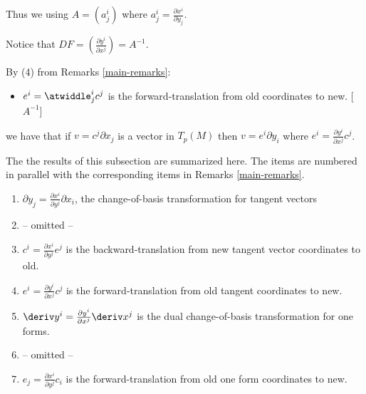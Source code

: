 \documentclass[oneside,12pt]{amsart}
\begin{document}
Thus we using $A = (a^i_j)$ where $a^i_j = \frac{\partial x^i}{\partial y_j}$.

Notice that $DF = (\frac{\partial y^i}{\partial x^j}) = A^{-1}$.

By (4) from Remarks \ref{main-remarks}:
\begin{itemize}
\item $e^i = \atwiddle^i_j c^j$ is the forward-translation from old coordinates to new. [$A^{-1}$]
\end{itemize}

we have that if $v = c^j \partial x_j$ is a vector in $T_p(M)$ then
$v = e^i \partial y_i$ where $e^i = \frac{\partial y^i}{\partial x^j} c^j$.

\begin{remarks}
The the results of this subsection are summarized here. The items are numbered in parallel with
the corresponding items in Remarks \ref{main-remarks}.
\begin{enumerate}
\item $\partial y_j = \frac{\partial x^i}{\partial y^j} \partial x_i$, the change-of-basis transformation for tangent vectors
\item -- omitted --
\item $c^i = \frac{\partial x^i}{\partial y^j} e^j$ is the backward-translation from new tangent vector coordinates to old.
\item $e^i = \frac{\partial y^i}{\partial x^j} c^j$ is the forward-translation from old tangent coordinates to new.

\item $\deriv y^i = \frac{\partial y^i}{\partial x^j} \deriv x^j$ is the dual change-of-basis transformation for one forms. 
\item -- omitted --
\item $e_j = \frac{\partial x^i}{\partial y^j} c_i$ is the forward-translation from old one form coordinates
to new.
\end{enumerate}
\end{remarks}


 



\end{document}
